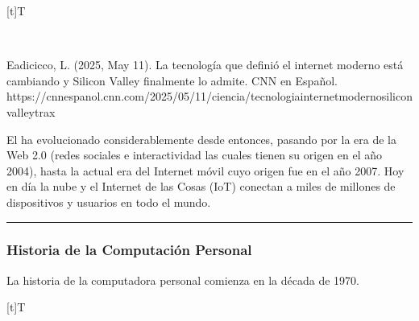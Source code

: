 \documentclass[letterpaper,10pt,spanish]{sphinxmanual}
\let\sphinxpxdimen\pdfpxdimen\else\newdimen\sphinxpxdimen
\begin{document}
\begin{savenotes}\sphinxattablestart
\sphinxthistablewithglobalstyle
\centering
\begin{tabulary}{\linewidth}[t]{T}
\sphinxtoprule
\sphinxtableatstartofbodyhook

\begin{sphinxfigure-in-table}
\centering
\capstart
\noindent\sphinxincludegraphics[width=700\sphinxpxdimen]{{image03}.png}
\label{\detokenize{1_guias/10informatica/G1001:id28}}\end{sphinxfigure-in-table}\relax
\\
\sphinxbottomrule
\end{tabulary}
\sphinxtableafterendhook\par
\sphinxattableend\end{savenotes}

\sphinxAtStartPar
%
\begin{footnote}[4]\sphinxAtStartFootnote
Eadicicco, L. (2025, May 11). La tecnologí­a que definió el internet moderno está cambiando y Silicon Valley finalmente lo admite. CNN en Español. https://cnnespanol.cnn.com/2025/05/11/ciencia/tecnologia\sphinxhyphen{}internet\sphinxhyphen{}moderno\sphinxhyphen{}silicon\sphinxhyphen{}valley\sphinxhyphen{}trax
%
\end{footnote} El  ha evolucionado considerablemente desde entonces, pasando por la era de la Web 2.0 (redes sociales e interactividad las cuales tienen su origen en el año 2004), hasta la actual era del Internet móvil cuyo origen fue en el año 2007.  Hoy en día la nube y el Internet de las Cosas (IoT) conectan a miles de millones de dispositivos y usuarios en todo el mundo.


\bigskip\hrule\bigskip



\subsubsection{Historia de la Computación Personal}
\label{\detokenize{1_guias/10informatica/G1001:historia-de-la-computacion-personal}}
\sphinxAtStartPar
La historia de la computadora personal comienza en la década de 1970.


\begin{savenotes}\sphinxattablestart
\sphinxthistablewithglobalstyle
\centering
\begin{tabulary}{\linewidth}[t]{T}
\sphinxtoprule
\sphinxtableatstartofbodyhook

\begin{sphinxfigure-in-table}
\centering
\capstart
\noindent\sphinxincludegraphics[width=300\sphinxpxdimen]{{image04}.png}
\label{\detokenize{1_guias/10informatica/G1001:id29}}\end{sphinxfigure-in-table}\relax
\\
\sphinxbottomrule
\end{tabulary}
\sphinxtableafterendhook\par
\sphinxattableend\end{savenotes}
\end{document}
